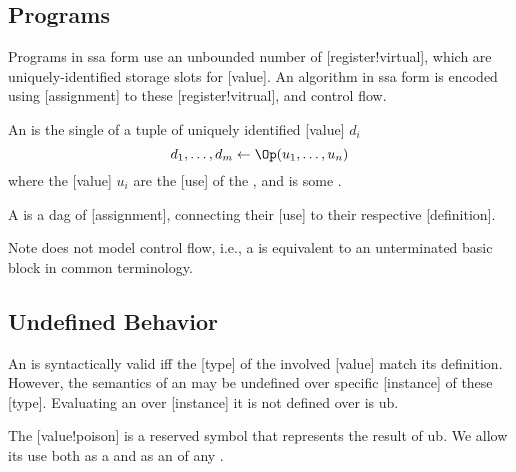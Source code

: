 \subsection{Programs}

Programs in \gls{ssa} form use an unbounded number of [register!virtual], which are uniquely-identified storage slots for [value].
An algorithm in \gls{ssa} form is encoded using [assignment] to these [register!vitrual], and control flow.

\begin{definition}[Assignment]
    An  is the single  of a tuple of uniquely identified [value] \(d_i\)
    \begin{equation*}
        d_1, \ldots, d_m \gets \Op(u_1, \ldots, u_n)
    \end{equation*}
    where the [value] \(u_i\) are the [use] of the , and \Op{} is some .
\end{definition}

\begin{definition}[Program]
    A  is a \gls{dag} of [assignment], connecting their [use] to their respective [definition].
\end{definition}

\begin{remark}{Note}
    \basetwo does not model control flow, i.e., a \basetwo {} is equivalent to an unterminated basic block in common terminology.
\end{remark}

\subsection{Undefined Behavior}

An  is syntactically valid iff the [type] of the involved [value] match its definition.
However, the semantics of an  may be undefined over specific [instance] of these [type].
Evaluating an  over [instance] it is not defined over is \gls{ub}.

\begin{definition}
    The [value!poison] \Poison{} is a reserved symbol that represents the result of \gls{ub}.
    We allow its use both as a  and as an  of any .
\end{definition}

